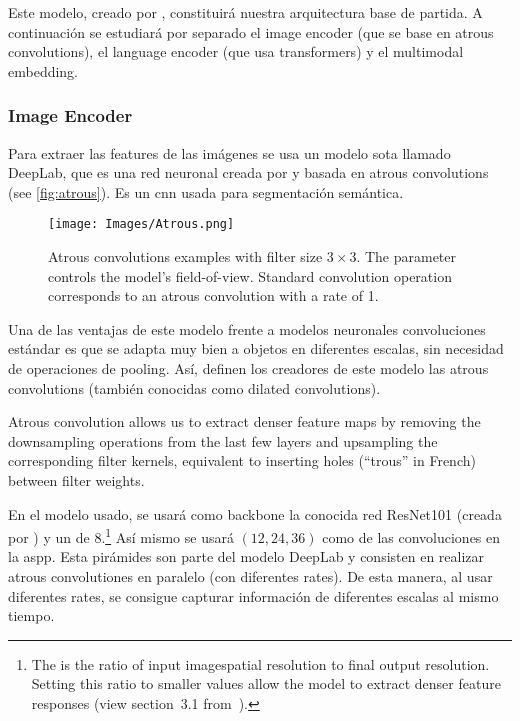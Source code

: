 Este modelo, creado por , constituirá nuestra
arquitectura base de partida. A continuación se estudiará por separado el image
encoder (que se base en atrous convolutions), el language encoder (que usa
transformers) y el multimodal embedding.

\subsubsection{Image Encoder}
Para extraer las features de las imágenes se usa un modelo \gls{sota} llamado
DeepLab, que es una red neuronal creada por  y basada en
atrous convolutions (see \vref{fig:atrous}). Es un \gls{cnn} usada para
segmentación semántica.

\begin{figure}[htb]
  \centering
  \texttt{[image: Images/Atrous.png]}
  \caption[Atrous convolutions examples]{Atrous convolutions examples with
    filter size \(3 \times 3\). The  parameter controls the model's
    field-of-view. Standard convolution operation corresponds to an atrous
    convolution with a rate of 1.}
  \label{fig:atrous}
\end{figure}

Una de las ventajas de este modelo frente a modelos neuronales convoluciones
estándar es que se adapta muy bien a objetos en diferentes escalas, sin
necesidad de operaciones de pooling. Así, definen los creadores de este modelo
las atrous convolutions (también conocidas como dilated convolutions).

\begin{quoteBox}
  Atrous convolution allows us to extract denser feature maps by removing the
  downsampling operations from the last few layers and upsampling the
  corresponding filter kernels, equivalent to inserting holes (``trous'' in
  French) between filter weights.
  \tcblower{}
\end{quoteBox}

En el modelo usado, se usará como backbone la conocida red ResNet101 (creada
por ) y un  de 8.\footnote{The
   is the ratio of input imagespatial resolution to final
  output resolution. Setting this ratio to smaller values allow the model to
  extract denser feature responses (view section~3.1
  from~\cite{chen17:rethin}).} Así mismo se usará \((12, 24, 36)\) como
 de las convoluciones en la \gls{aspp}. Esta pirámides son parte
del modelo DeepLab y consisten en realizar atrous convolutiones en paralelo
(con diferentes rates). De esta manera, al usar diferentes rates, se consigue
capturar información de diferentes escalas al mismo tiempo.

